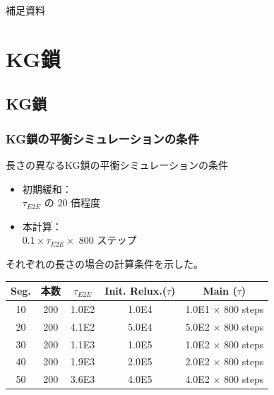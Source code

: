 \documentclass[11pt, dvipdfmx]{beamer}
\begin{document}
\begin{appendix}
\begin{frame}
\LARGE{補足資料}
\end{frame}


\section{KG鎖}
\subsection{KG鎖}
\begin{frame}
\frametitle{KG鎖の平衡シミュレーションの条件}

長さの異なるKG鎖の平衡シミュレーションの条件

\begin{itemize}
\item
初期緩和：\\$\tau_{E2E}$ の 20 倍程度
\item
本計算：\\$0.1 \times \tau_{E2E} \times$ 800 ステップ
\end{itemize}

それぞれの長さの場合の計算条件を示した。

\begin{table}[htb]
\begin{center}
{
\begin{tabular}{c c c c c} \hline
Seg.	& 本数	& $\tau_{E2E}$	& Init. Relux.($\tau$)	& Main ($\tau$)	\\ \hline \hline	
10		& 200	& 1.0E2			& 1.0E4				&	1.0E1 $\times$ 800 steps \\ \hline	
20		& 200	& 4.1E2			& 5.0E4				&	5.0E2 $\times$ 800 steps \\ \hline	
30		& 200	& 1.1E3			& 1.0E5				&	1.0E2 $\times$ 800 steps \\ \hline	
40		& 200	& 1.9E3			& 2.0E5				&	2.0E2 $\times$ 800 steps \\ \hline	
50		& 200	& 3.6E3			& 4.0E5				&	4.0E2 $\times$ 800 steps \\ \hline
\end{tabular}
}
\end{center}
\end{table}

\end{frame}



\end{appendix}
\end{document}
